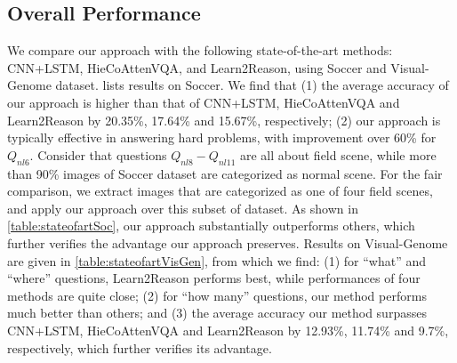%
%
%
%

\subsection{Overall Performance}
\label{sec-overall-performance}

We compare our approach with the following state-of-the-art methods: CNN+LSTM, HieCoAttenVQA, and Learn2Reason, using Soccer and Visual-Genome dataset. 
 lists results on Soccer. We find that (1) the average accuracy of our approach is higher than that of CNN+LSTM, HieCoAttenVQA and Learn2Reason by 20.35\%, 17.64\% and 15.67\%,  respectively; (2) our approach is typically effective in answering hard problems, \eg with improvement over 60\% for $Q_{nl6}$. 
Consider that questions $Q_{nl8}-Q_{nl11}$ are all about field scene, while more than 90\% images of Soccer dataset are categorized as normal scene. For the fair comparison, we extract images that are categorized as one of four field scenes, and apply our approach over this subset of dataset. As shown in \cref{table:stateofartSoc}, our approach substantially outperforms others, which further verifies the advantage our approach preserves. 
Results on Visual-Genome are given in \cref{table:stateofartVisGen}, from which we find: (1) for ``what'' and ``where'' questions, Learn2Reason performs best, while performances of four methods are quite close; (2) for ``how many'' questions, our method performs much better than others; and (3) the average accuracy our method  surpasses CNN+LSTM, HieCoAttenVQA and Learn2Reason by 12.93\%, 11.74\% and 9.7\%, respectively, which further verifies its advantage. 

